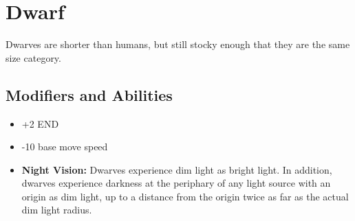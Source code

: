 \section{Dwarf}\label{dwarf}
Dwarves are shorter than humans, but still stocky enough that they are the same
size category.

\subsection*{Modifiers and Abilities}
\begin{itemize}
    \item +2 END
    \item -10 base move speed
    \item \textbf{Night Vision:} Dwarves experience dim light as bright light.
        In addition, dwarves experience darkness at the periphary of any
        light source with an origin as dim light, up to a distance from the
        origin twice as far as the actual dim light radius.
\end{itemize}
